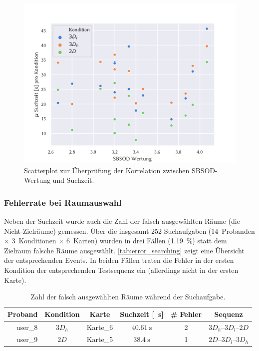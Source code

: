 \begin{figure}[h]
    \centering
    \includegraphics[trim={0cm, 0cm, 1.25cm, 1.25cm}, clip, width=0.75\linewidth]{figures/analysis/correlation_time_sbsod_scatter}
    \caption{Scatterplot zur Überprüfung der Korrelation zwischen SBSOD-Wertung und Suchzeit.}
    \label{fig:correlation_time_sbsod}
\end{figure}

\subsubsection*{Fehlerrate bei Raumauswahl}
Neben der Suchzeit wurde auch die Zahl der falsch ausgewählten Räume (die Nicht-Zielräume) gemessen.
Über die insgesamt 252 Suchaufgaben (14~Probanden $\times$ 3~Konditionen $\times$ 6~Karten) wurden in drei Fällen (\SI{1,19}{\percent}) statt dem Zielraum falsche Räume ausgewählt.
\autoref{tab:error_searching} zeigt eine Übersicht der entsprechenden Events.
In beiden Fällen traten die Fehler in der ersten Kondition der entsprechenden Testsequenz ein (allerdings nicht in der ersten Karte).
\begin{table}[h]
    \centering
    \caption{Zahl der falsch ausgewählten Räume während der Suchaufgabe.}
    \label{tab:error_searching}
    \begin{tabular}{rccccc}\toprule
        Proband                  & Kondition               & Karte    & Suchzeit [\SI{}{\second}] & \# Fehler & Sequenz  \\\midrule
        user\_8                  & $3D_h$                  & Karte\_6 & $\SI{40,61}{\second}$     & 2         & $3D_h$--$3D_l$--$2D$ \\
        user\_9                  & $2D$                    & Karte\_5 & $\SI{38,4}{\second}$      & 1         & $2D$--$3D_l$--$3D_h$ \\\bottomrule
    \end{tabular}
\end{table}

